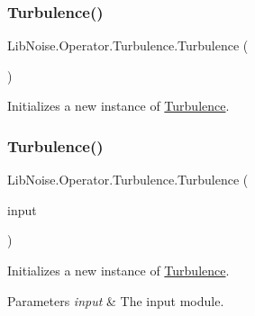 \subsubsection{\texorpdfstring{Turbulence()}{Turbulence()}\hspace{0.1cm}{\footnotesize\ttfamily [1/4]}}
{\footnotesize\ttfamily Lib\+Noise.\+Operator.\+Turbulence.\+Turbulence (\begin{DoxyParamCaption}{ }\end{DoxyParamCaption})}



Initializes a new instance of \hyperlink{class_lib_noise_1_1_operator_1_1_turbulence}{Turbulence}. 

\mbox{\label{class_lib_noise_1_1_operator_1_1_turbulence_adebaad80f53e18ef1371ef0bf1e11d1d}} 
\subsubsection{\texorpdfstring{Turbulence()}{Turbulence()}\hspace{0.1cm}{\footnotesize\ttfamily [2/4]}}
{\footnotesize\ttfamily Lib\+Noise.\+Operator.\+Turbulence.\+Turbulence (\begin{DoxyParamCaption}\item[{\hyperlink{class_lib_noise_1_1_module_base}{Module\+Base}}]{input }\end{DoxyParamCaption})}



Initializes a new instance of \hyperlink{class_lib_noise_1_1_operator_1_1_turbulence}{Turbulence}. 


\begin{DoxyParams}{Parameters}
{\em input} & The input module.\\
\hline
\end{DoxyParams}
\mbox{\label{class_lib_noise_1_1_operator_1_1_turbulence_a495df95b79f6f4be7d7f670e53a52988}} 
